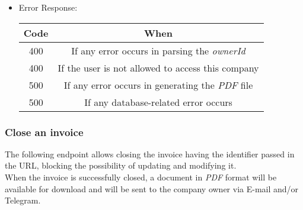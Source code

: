 \begin{itemize}
    \item Error Response:
    \begin{table}[!h]
    \centering 
    \begin{tabular}{|c|c|}
    \hline
    \multicolumn{1}{|c|}{\textbf{Code}} & \multicolumn{1}{c|}{\textbf{When}} \\ \hline
    400 & If any error occurs in parsing the \textit{ownerId}  \\\hline
    400 & If the user is not allowed to access this company \\\hline
    500 & If any error occurs in generating the \textit{PDF} file \\\hline
    500 & If any database-related error occurs \\\hline
    \end{tabular} 
    \end{table} 
    
\end{itemize}


\newpage
\subsubsection*{Close an invoice}

The following endpoint allows closing the invoice having the identifier passed in the URL, blocking the possibility of updating and modifying it. \\
When the invoice is successfully closed, a document in \textit{PDF} format will be available for download and will be sent to the company owner via E-mail and/or Telegram. 

